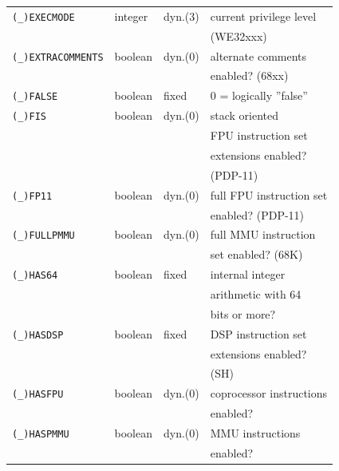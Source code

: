 \documentclass[12pt,twoside]{report}
\newcommand{\predefsym}[1]{{\tt (\_)#1}}
\begin{document}
\begin{center}
\begin{longtable}{|l|l|l|l|}
\hline
\predefsym{EXECMODE}   & integer     & dyn.(3)    & current privilege level \\
                       &             &            & (WE32xxx) \\
\hline
\predefsym{EXTRACOMMENTS} & boolean  & dyn.(0)    & alternate comments \\
                       &             &            & enabled? (68xx) \\
\hline
\predefsym{FALSE}      & boolean     & fixed      & 0 = logically ''false'' \\
\hline
\predefsym{FIS}        & boolean     & dyn.(0)    & stack oriented \\
                       &             &            & FPU instruction set \\
                       &             &            & extensions enabled? \\
                       &             &            & (PDP-11) \\
\hline
\predefsym{FP11}       & boolean     & dyn.(0)    & full FPU instruction set \\
                       &             &            & enabled? (PDP-11) \\
\hline
\predefsym{FULLPMMU}   & boolean     & dyn.(0)    & full MMU instruction \\
                       &             &            & set enabled? (68K) \\
\hline
\predefsym{HAS64}      & boolean     & fixed      & internal integer \\
                       &             &            & arithmetic with 64 \\
                       &             &            & bits or more? \\
\hline
\predefsym{HASDSP}     & boolean     & fixed      & DSP instruction set \\
                       &             &            & extensions enabled? \\
                       &             &            & (SH) \\
\hline
\predefsym{HASFPU}     & boolean     & dyn.(0)    & coprocessor instructions \\
                       &             &            & enabled? \\
\hline
\predefsym{HASPMMU}    & boolean     & dyn.(0)    & MMU instructions \\
                       &             &            & enabled? \\

\end{longtable}
\end{center}
\end{document}
